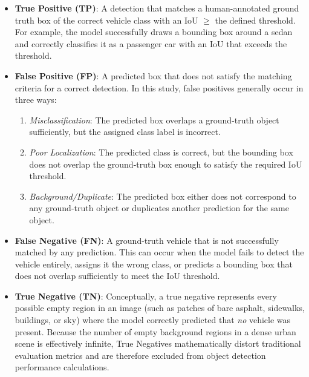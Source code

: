 \begin{itemize}
    \item \textbf{True Positive (TP)}: A detection that matches a human-annotated
    ground truth box of the correct vehicle class with an IoU $\geq$ the defined 
    threshold. For example, the model successfully draws a bounding box around a 
    sedan and correctly classifies it as a passenger car with an IoU 
    that exceeds the threshold.

    \item \textbf{False Positive (FP)}: A predicted box that does not satisfy the
    matching criteria for a correct detection. In this study, false positives
    generally occur in three ways:
    \begin{enumerate}
        \item \textit{Misclassification}: The predicted box overlaps a ground-truth
        object sufficiently, but the assigned class label is incorrect.

        \item \textit{Poor Localization}: The predicted class is correct, but the
        bounding box does not overlap the ground-truth box enough to satisfy the
        required IoU threshold.

        \item \textit{Background/Duplicate}: The predicted box either does not
        correspond to any ground-truth object or duplicates another prediction for
        the same object.
    \end{enumerate}

    \item \textbf{False Negative (FN)}: A ground-truth vehicle that is not successfully
    matched by any prediction. This can occur when the model fails to detect the
    vehicle entirely, assigns it the wrong class, or predicts a bounding box that
    does not overlap sufficiently to meet the IoU threshold.

    \item \textbf{True Negative (TN)}: Conceptually, a true negative represents
    every possible empty region in an image (such as patches of bare asphalt, 
    sidewalks, buildings, or sky) where the model correctly predicted that \textit{no} 
    vehicle was present. Because the number of empty background regions in a 
    dense urban scene is effectively infinite, True Negatives mathematically 
    distort traditional evaluation metrics and are therefore excluded from 
    object detection performance calculations.
\end{itemize}


